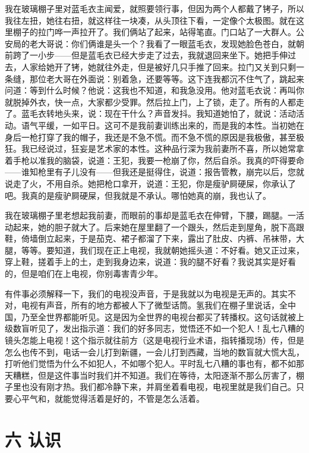 我在玻璃棚子里对蓝毛衣主闻爱，就照要领行事，但因为两个人都戴了铐子，所以我往左扭，她往右扭，就这样往一块凑，从头顶往下看，一定像个太极图。就在这里棚子的拉门哗一声拉开了。我们俩站了起来，站得笔直。门口站了一大群人。公安局的老大哥说：你们俩谁是头一个？我看了一眼蓝毛衣，发现她脸色苍白，就朝前跨了一小步——但是蓝毛衣已经大步走了过去，我就退回来坐下。她把手伸过去，人家给她开了铐，她就往外走，但是被好几只手推了回来。拉门又关到只剩一条缝，那位老大哥在外面说：别着急，还要等等。这下连我都沉不住气了，跳起来问道：等到什么时候？他说：这我也不知道，和我急没用。他对蓝毛衣说：再叫你就脱掉外衣，快一点，大家都少受罪。然后拉上门，上了锁，走了。所有的人都走了。蓝毛衣转地头来，说：现在干什么？声音发抖。我知道她怕了，就说：活动活动。语气平缓，一如平日。这可不是我前妻训练出来的，而是我的本性。当初她在身后一枪打穿了我的帽子，我还是不急不慌。而不急不慌的原因是我极傲，甚至极狂。我已经说过，狂妄是艺术家的本性。这种品行深为我前妻所不喜，所以她常拿着手枪以准我的脑袋，说道：王犯，我要一枪崩了你，然后自杀。我真的吓得要命 ——谁知枪里有子儿没有——但我还是挺得住，说道：报告管教，崩完以后，您就说走了火，不用自杀。她把枪口拿开，说道：王犯，你是瘦驴屙硬屎，你承认了吧。我真的是瘦驴屙硬屎，但我就是不承认。哪怕她真的崩，我也认了。 



我在玻璃棚子里老想起我前妻，而眼前的事却是蓝毛衣在伸臂，下腰，踢腿。一活动起来，她的胆子就大了。后来她在屋里翻了一个跟头，然后走到屋角，脱下高跟鞋，倚墙倒立起来，于是茄克、裙子都溜了下来，露出了肚皮、内裤、吊袜带，大腿，等等。要知道，我们现在正上电视，我就朝她摇头道：不好看。她又正过来，穿上鞋，搓着手上的土，走到我身边来，说道：我的腿不好看？我说其实是好看的，但是咱们在上电视，你别毒害青少年。 

有件事必须解释一下，我们的电视没声音，于是我就以为电视是无声的。其实不对，电视有声音，所有的地方都被人下了微型话筒。氢我们在棚子里说话，全中国，乃至全世界都能听见。这是因为全世界的电视台都买了转播权。这句话就被上级数盲听见了，发出指示道：我们的好多同志，觉悟还不如一个犯人！乱七八糟的镜头怎能上电视！这个指示就往前方（这是电视行业术语，指转播现场）传，但是怎么也传不到，电话一会儿打到新疆，一会儿打到西藏，当地的数盲就大慌大乱，打听他们觉悟为什么不如犯人，不如哪个犯人。平时乱七八糟的事也有，都不如那天糟糕，但是这件事当时我们并不知道。我们在等待，太阳逐渐不那么厉害了，棚子里也没有刚才热。我们都冷静下来，并肩坐着看电视，电视里就是我们自己。只要心平气和，就能觉得活着是好的，不管是怎么活着。 



\section{六 认识}

